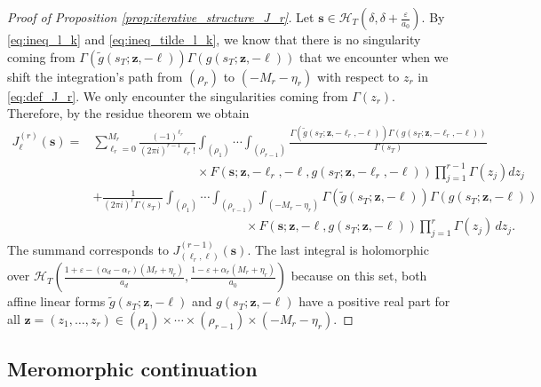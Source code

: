 \documentclass[a4paper,12pt]{article}
\theoremstyle{definition}
\numberwithin{equation}{section}
\newcommand{\dd}{d}
\newcommand{\ii}{i}
\begin{document}
\begin{proof}[Proof of Proposition \ref{prop:iterative_structure_J_r}]
Let $\mathbf{s} \in \mathcal{H}_T(\delta,\delta+\frac{\varepsilon}{a_0})$. By \eqref{eq:ineq_l_k} and \eqref{eq:ineq_tilde_l_k}, we know that there is no singularity coming from $\Gamma(\widetilde{g}(s_T;\mathbf{z},-\boldsymbol{\ell}))\Gamma(g(s_T;\mathbf{z},-\boldsymbol{\ell}))$ that we encounter when we shift the integration's path from $(\rho_r)$ to $(-M_r-\eta_r)$ with respect to $z_r$ in \eqref{eq:def_J_r}. We only encounter the singularities coming from $\Gamma(z_r)$. Therefore, by the residue theorem we obtain
\begin{align*}
    J^{(r)}_{\boldsymbol{\ell}}(\mathbf{s})=& \sum_{\ell_r=0}^{M_r} \frac{(-1)^{\ell_r}}{(2\pi \ii)^{r-1}\ell_r!} \int_{(\rho_1)} \cdots \int_{(\rho_{r-1})}  \frac{\Gamma(\widetilde{g}(s_T;\mathbf{z},-\ell_r,-\boldsymbol{\ell}))\Gamma(g(s_T;\mathbf{z},-\ell_r,-\boldsymbol{\ell}))}{\Gamma(s_T)} \\
    & \hspace{100pt} \times F(\mathbf{s};\mathbf{z},-\ell_{r},-\boldsymbol{\ell},g(s_T;\mathbf{z},-\ell_r,-\boldsymbol{\ell}))\prod_{j=1}^{r-1} \Gamma(z_j) \dd z_j \\
    & + \frac{1}{(2\pi \ii)^r\Gamma(s_T)} \int_{(\rho_1)} \cdots \int_{(\rho_{r-1})}\int_{(-M_{r}-\eta_{r})} \Gamma(\widetilde{g}(s_T;\mathbf{z},-\boldsymbol{\ell}))\Gamma(g(s_T;\mathbf{z},-\boldsymbol{\ell}))\\
    & \hspace{147pt} \times F(\mathbf{s};\mathbf{z},-\boldsymbol{\ell},g(s_T;\mathbf{z},-\boldsymbol{\ell})) \prod_{j=1}^r \Gamma(z_j) \, \dd z_j.
\end{align*}
The summand corresponds to $J^{(r-1)}_{(\ell_r,\boldsymbol{\ell})}(\mathbf{s})$. The last integral is holomorphic over $\mathcal{H}_T(\frac{1+\varepsilon-(\alpha_d-\alpha_r)(M_r+\eta_r)}{a_d},\frac{1-\varepsilon+\alpha_r(M_r+\eta_r)}{a_0})$ because on this set, both affine linear forms $\widetilde{g}(s_T;\mathbf{z},-\boldsymbol{\ell})$ and $g(s_T;\mathbf{z},-\boldsymbol{\ell})$ have a positive real part for all $\mathbf{z}=(z_1,\ldots,z_r) \in (\rho_1) \times \cdots \times (\rho_{r-1}) \times (-M_r-\eta_r)$.
\end{proof}

\subsection{Meromorphic continuation}
\label{subsection:meromorphic_continuation_zeta_n}
\end{document}
